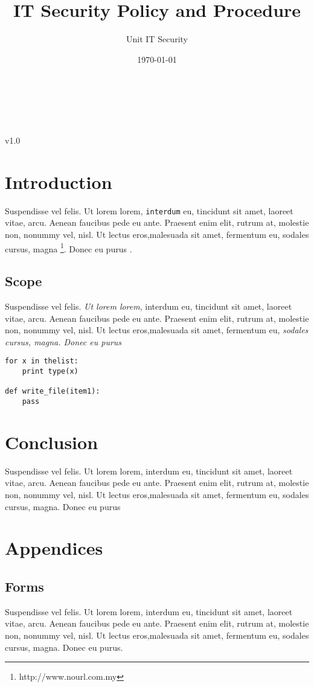 \documentclass[11pt,a4paper, twocolumn]{article}
\title{IT Security Policy and Procedure}
\author{Unit IT Security}
\date{\today}
\makeatletter
\def\version{v1.0} %
\renewcommand{\maketitle}{\bgroup\setlength{\parindent}{2pt}
\begin{flushleft}
  \textbf{\LARGE \@title} \\
  \@author \\
  \@date \\
  \version
\end{flushleft}\egroup
}
\makeatother
\begin{document}
\maketitle
\noindent \hrulefill %
\thispagestyle{empty} %

\section{Introduction}
Suspendisse vel felis. Ut lorem lorem, \texttt{interdum} eu, tincidunt sit amet, laoreet vitae, arcu. Aenean faucibus pede eu ante. Praesent enim elit, rutrum at, molestie non, nonummy vel, nisl. Ut lectus eros,malesuada sit amet, fermentum eu, sodales cursus, magna \footnote{http://www.nourl.com.my}. Donec eu purus \cite{book1}.

\subsection{Scope}
Suspendisse vel felis. \emph{Ut lorem lorem}, interdum eu, tincidunt sit amet, laoreet vitae, arcu. Aenean faucibus pede eu ante. Praesent enim elit, rutrum at, molestie non, nonummy vel, nisl. Ut lectus eros,malesuada sit amet, fermentum eu, \textit{sodales cursus, magna. Donec eu purus}

\begin{verbatim}
for x in thelist:
    print type(x)

def write_file(item1):
    pass
\end{verbatim}


\section{Conclusion}
Suspendisse vel felis. Ut lorem lorem, interdum eu, tincidunt sit amet, laoreet vitae, arcu. Aenean faucibus pede eu ante. Praesent enim elit, rutrum at, molestie non, nonummy vel, nisl. Ut lectus eros,malesuada sit amet, fermentum eu, sodales cursus, magna. Donec eu purus

\newpage


 

\appendix
{}
\section{Appendices}
\subsection{Forms}
Suspendisse vel felis. Ut lorem lorem, interdum eu, tincidunt sit amet, laoreet vitae, arcu. Aenean faucibus pede eu ante. Praesent enim elit, rutrum at, molestie non, nonummy vel, nisl. Ut lectus eros,malesuada sit amet, fermentum eu, sodales cursus, magna. Donec eu purus.
\end{document}
